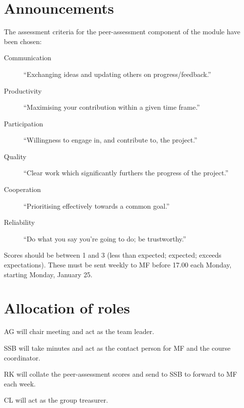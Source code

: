 \documentclass[a4paper,11pt,twoside,class=meetingmins,crop=false]{standalone}
\begin{document}

\maketitle

\section{Announcements}
\begin{hiddenitems}
    \item
    The assessment criteria for the peer-assessment component of the module have been chosen:
    \begin{description}
        \item[Communication] ``Exchanging ideas and updating others on progress/feedback.''
        \item[Productivity] ``Maximising your contribution within a given time frame.''
        \item[Participation] ``Willingness to engage in, and contribute to, the project.''
        \item[Quality] ``Clear work which significantly furthers the progress of the project.''
        \item[Cooperation] ``Prioritising effectively towards a common goal.''
        \item[Reliability] ``Do what you say you're going to do; be trustworthy.''
    \end{description}
    Scores should be between 1 and 3 (less than expected; expected; exceeds expectations).
    These must be sent weekly to MF before 17.00 each Monday, starting Monday, January 25.

\end{hiddenitems}

\section{Allocation of roles}
\begin{items}
    \item AG will chair meeting and act as the team leader.
    \item SSB will take minutes and act as the contact person for MF and the course coordinator.
    \item RK will collate the peer-assessment scores and send to SSB to forward to MF each week.
    \item CL will act as the group treasurer.
\end{items}
\end{document}
